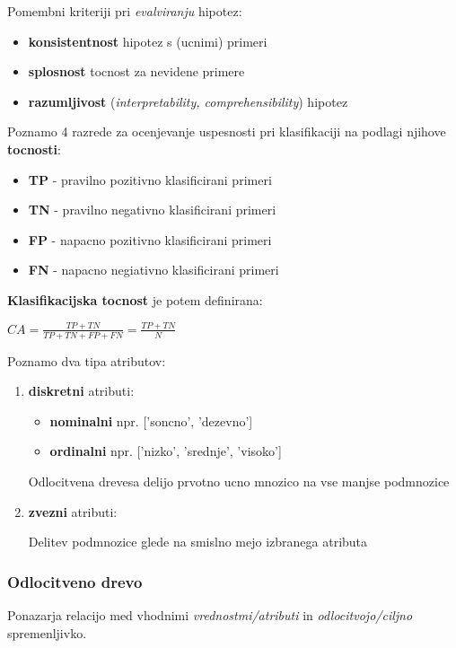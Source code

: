\documentclass{article}
\begin{document}
\begin{multicols}{2}
Pomembni kriteriji pri \textit{evalviranju} hipotez:
\begin{itemize}
  \item \textbf{konsistentnost} hipotez s (ucnimi) primeri
  \item \textbf{splosnost} tocnost za nevidene primere 
  \item \textbf{razumljivost} (\textit{interpretability, comprehensibility}) hipotez
\end{itemize}

Poznamo 4 razrede za ocenjevanje uspesnosti pri klasifikaciji na podlagi njihove \textbf{tocnosti}:
\begin{itemize}
  \item \textbf{TP} - pravilno pozitivno klasificirani primeri
  \item \textbf{TN} - pravilno negativno klasificirani primeri 
  \item \textbf{FP} - napacno pozitivno klasificirani primeri
  \item \textbf{FN} - napacno negiativno klasificirani primeri
\end{itemize}

\textbf{Klasifikacijska tocnost} je potem definirana:

\begin{center}
  \begin{math}
    CA = \frac{TP + TN}{TP + TN + FP + FN} = \frac{TP + TN}{N}
  \end{math}
\end{center}

Poznamo dva tipa atributov:

\begin{enumerate}
  \item \textbf{diskretni} atributi:
    \begin{itemize}
      \item  \textbf{nominalni} npr. ['soncno', 'dezevno']
      \item  \textbf{ordinalni} npr. ['nizko', 'srednje', 'visoko']
    \end{itemize}
    Odlocitvena drevesa delijo prvotno ucno mnozico na vse manjse podmnozice
  \item \textbf{zvezni} atributi:

    Delitev podmnozice glede na smislno mejo izbranega atributa
\end{enumerate}

\subsubsection{Odlocitveno drevo}
Ponazarja relacijo med vhodnimi \textit{vrednostmi/atributi} in \textit{odlocitvojo/ciljno} spremenljivko.


\end{multicols}
\end{document}
